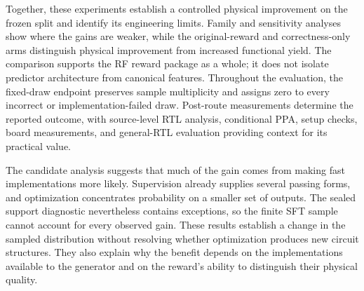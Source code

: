 Together, these experiments establish a controlled physical improvement on
the frozen split and identify its engineering limits. Family and sensitivity
analyses show where the gains are weaker, while the original-reward and
correctness-only arms distinguish physical improvement from increased
functional yield. The comparison supports the RF reward package as a whole;
it does not isolate predictor architecture from canonical features. Throughout
the evaluation, the fixed-draw endpoint preserves sample multiplicity and
assigns zero to every incorrect or implementation-failed draw. Post-route
measurements determine the reported outcome, with source-level RTL analysis,
conditional PPA, setup checks, board measurements, and general-RTL evaluation
providing context for its practical value.

The candidate analysis suggests that much of the gain comes from making fast
implementations more likely. Supervision already supplies several passing
forms, and optimization concentrates probability on a smaller set of outputs.
The sealed support diagnostic nevertheless contains exceptions, so the finite
SFT sample cannot account for every observed gain. These results establish a
change in the sampled distribution without resolving whether optimization
produces new circuit structures. They also explain why the benefit depends
on the implementations available to the generator and on the reward's ability
to distinguish their physical quality.
